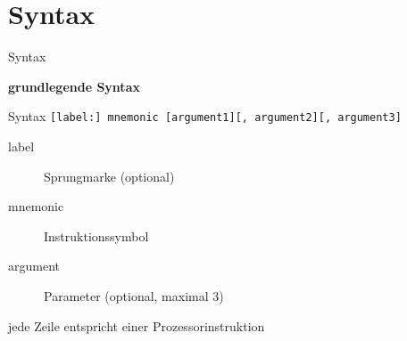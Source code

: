 \section{Syntax}

\begin{frame}{Syntax}
\begin{center}
\textbf{grundlegende Syntax}
\end{center}

	Syntax
	\texttt{[label:] mnemonic [argument1][, argument2][, argument3]}

	\makebox{}

	\begin{description}
		\item [label] Sprungmarke (optional)
		\item [mnemonic] Instruktionssymbol 
		\item [argument] Parameter (optional, maximal 3)
	\end{description}

	\makebox{}

	jede Zeile entspricht einer Prozessorinstruktion  
\end{frame}


